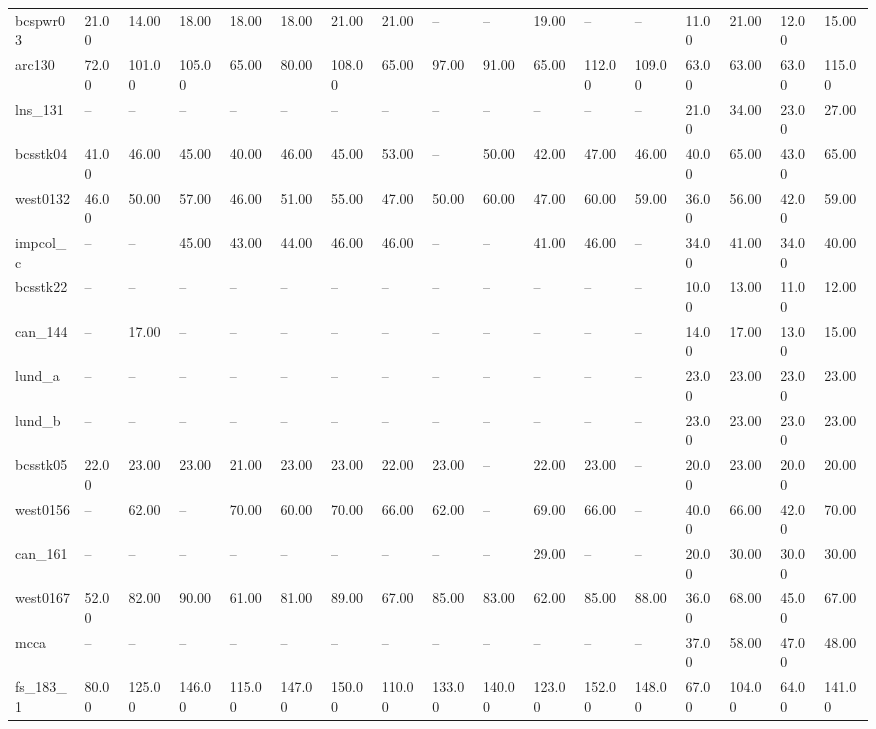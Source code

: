 \begin{tabular}{lllllllllllllllll}
bcspwr03 & 21.00 & 14.00 & 18.00 & 18.00 & 18.00 & 21.00 & 21.00 & -- & -- & 19.00 & -- & -- & 11.00 & 21.00 & 12.00 & 15.00 \\
arc130 & 72.00 & 101.00 & 105.00 & 65.00 & 80.00 & 108.00 & 65.00 & 97.00 & 91.00 & 65.00 & 112.00 & 109.00 & 63.00 & 63.00 & 63.00 & 115.00 \\
lns\_131 & -- & -- & -- & -- & -- & -- & -- & -- & -- & -- & -- & -- & 21.00 & 34.00 & 23.00 & 27.00 \\
bcsstk04 & 41.00 & 46.00 & 45.00 & 40.00 & 46.00 & 45.00 & 53.00 & -- & 50.00 & 42.00 & 47.00 & 46.00 & 40.00 & 65.00 & 43.00 & 65.00 \\
west0132 & 46.00 & 50.00 & 57.00 & 46.00 & 51.00 & 55.00 & 47.00 & 50.00 & 60.00 & 47.00 & 60.00 & 59.00 & 36.00 & 56.00 & 42.00 & 59.00 \\
impcol\_c & -- & -- & 45.00 & 43.00 & 44.00 & 46.00 & 46.00 & -- & -- & 41.00 & 46.00 & -- & 34.00 & 41.00 & 34.00 & 40.00 \\
bcsstk22 & -- & -- & -- & -- & -- & -- & -- & -- & -- & -- & -- & -- & 10.00 & 13.00 & 11.00 & 12.00 \\
can\_144 & -- & 17.00 & -- & -- & -- & -- & -- & -- & -- & -- & -- & -- & 14.00 & 17.00 & 13.00 & 15.00 \\
lund\_a & -- & -- & -- & -- & -- & -- & -- & -- & -- & -- & -- & -- & 23.00 & 23.00 & 23.00 & 23.00 \\
lund\_b & -- & -- & -- & -- & -- & -- & -- & -- & -- & -- & -- & -- & 23.00 & 23.00 & 23.00 & 23.00 \\
bcsstk05 & 22.00 & 23.00 & 23.00 & 21.00 & 23.00 & 23.00 & 22.00 & 23.00 & -- & 22.00 & 23.00 & -- & 20.00 & 23.00 & 20.00 & 20.00 \\
west0156 & -- & 62.00 & -- & 70.00 & 60.00 & 70.00 & 66.00 & 62.00 & -- & 69.00 & 66.00 & -- & 40.00 & 66.00 & 42.00 & 70.00 \\
can\_161 & -- & -- & -- & -- & -- & -- & -- & -- & -- & 29.00 & -- & -- & 20.00 & 30.00 & 30.00 & 30.00 \\
west0167 & 52.00 & 82.00 & 90.00 & 61.00 & 81.00 & 89.00 & 67.00 & 85.00 & 83.00 & 62.00 & 85.00 & 88.00 & 36.00 & 68.00 & 45.00 & 67.00 \\
mcca & -- & -- & -- & -- & -- & -- & -- & -- & -- & -- & -- & -- & 37.00 & 58.00 & 47.00 & 48.00 \\
fs\_183\_1 & 80.00 & 125.00 & 146.00 & 115.00 & 147.00 & 150.00 & 110.00 & 133.00 & 140.00 & 123.00 & 152.00 & 148.00 & 67.00 & 104.00 & 64.00 & 141.00 \\

\end{tabular}
